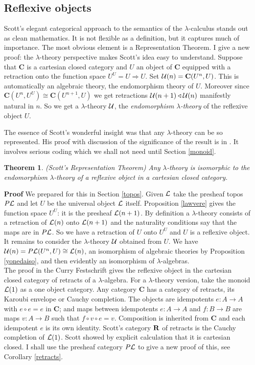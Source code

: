 \documentclass[12pt, amstex, amssymb]{article}
\newtheorem{theorem}{Theorem}[section]
\newcommand{\ret}{\triangleleft}
\newcommand{\mcat}{\cal}
\newcommand{\cat}{\mathbf}
\begin{document}
\subsection{Reflexive objects} 
Scott's elegant categorical approach to the semantics of the
$\lambda$-calculus stands out as clean mathematics. It
is not flexible as a definition,
but it captures much of importance.
The most obvious element is a Representation
Theorem. I give a new proof: the $\lambda$-theory
perspective makes Scott's idea easy to understand. 
Suppose that $\cat C$ is a 
cartesian closed category and $U$
an object of $\cat C$ equipped with a retraction onto
the function space $U^U = U \! \Rightarrow \! U$. Set 
${\mcat U}(n) = {\cat C}(U^n,U)$. This is automatically
an algebraic theory, the endomorphism
theory of $U$. Moreover since 
${\cat C}(U^n, U^U)  \cong {\cat C}(U^{n+1}, U)$ we get
retractions
${\mcat U}(n+1) \ret {\mcat U}(n)$ manifestly natural in $n$.
So we get a $\lambda$-theory $\mcat U$, the {\em endomorphism
$\lambda$-theory} of the reflexive object $U$.

The essence of
Scott's wonderful insight was that any $\lambda$-theory 
can be so represented. His proof with discussion
of the significance of the result is in \cite{Scott80}. 
It involves serious coding which we shall not need until Section \ref{monoid}.
\begin{theorem} {\rm (Scott's Representation Theorem)} 
Any $\lambda$-theory is isomorphic to the endomorphism
$\lambda$-theory of a reflexive object in
a cartesian closed category.\label{rep1}
\end{theorem}
{\bf Proof} We prepared for this in
Section \ref{topos}. Given $\mcat L$ take 
the presheaf topos $P{\mcat L}$ and let $U$ be the
universal object $\mcat L$ itself. Proposition \ref{lawvere}
gives the function space
$U^U$: it is the presheaf ${\mcat L}(n+1)$. By
definition a $\lambda$-theory consists of a retraction of
${\mcat L}(n)$ onto ${\mcat L}(n+1)$ and the naturality
conditions say that the maps are in
$P{\mcat L}$. So we have a retraction of $U$ onto $U^U$
and $U$ is a reflexive object.
It remains to consider the $\lambda$-theory $\mcat U$
obtained from $U$. We have 
${\mcat U}(n) = {P{\mcat L}}(U^n,U) \cong {\mcat L}(n)$,
an isomorphism of algebraic theories 
by Proposition \ref{yonedaiso}, and then evidently
an isomorphism of $\lambda$-algebras.\\[0.4em]
The proof \cite{Scott80}
in the Curry Festschrift gives the reflexive object
in the cartesian closed category of retracts of a $\lambda$-algebra.
For a $\lambda$-theory version, take the monoid ${\mcat L}(1)$ 
as a one object category. Any category $\cat C$ has
a category of retracts, its Karoubi envelope or Cauchy completion.
The objects are idempotents $e: A \to A$ with $e \circ e = e$ in $\cat C$;
and maps between idempotents $e: A \to A$ 
and $f: B \to B$ are maps $v : A \to B$ such that $f \circ v \circ e = v$.
Composition is inherited from $\cat C$ and each idempotent $e$
is its own identity. Scott's category $\bf R$ of retracts
is the Cauchy completion of
${{\mcat L}(1)}$. Scott showed by explicit calculation
that it is cartesian closed. I shall use the presheaf category
$P{\mcat L}$ to give a new proof of this, see Corollary \ref{retracts}.
\end{document}
